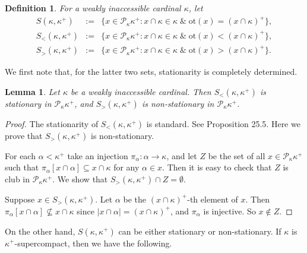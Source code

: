 \documentclass[a4paper,12pt,reqno,oneside]{amsart}
\theoremstyle{plain}
\newtheorem{lemma}[theorem]{Lemma}
\newtheorem*{definition*}{Definition}
\newcommand{\otp}{\mathrm{ot}}
\newcommand{\mcal}{\mathcal}
\begin{document}
\begin{definition*}
For a weakly inaccessible cardinal $\kappa$, let
\begin{eqnarray*}
S ( \kappa , \kappa^+ ) & := & \{ x \in \mcal{P}_\kappa \kappa^+ : x \cap \kappa \in \kappa \;\&\; \otp (x) = ( x \cap \kappa )^+ \} , \\
S_<(\kappa, \kappa^+ ) & := & \{ x \in \mcal{P}_\kappa \kappa^+ :  x \cap \kappa \in \kappa \;\&\; \otp (x) < (x\cap \kappa)^+ \} , \\
S_> (\kappa, \kappa^+ ) & := & \{ x \in \mcal{P}_\kappa \kappa^+ :  x \cap \kappa \in \kappa \;\&\; \otp (x) > (x\cap \kappa)^+ \} .
\end{eqnarray*}
\end{definition*}


We first note that, for the latter two sets, stationarity is completely determined.

\begin{lemma}\label{lem:S_<_S_>_stat} 
Let $\kappa$ be a weakly inaccessible cardinal. Then $S_< ( \kappa , \kappa^+ )$ is stationary in $\mcal{P}_\kappa \kappa^+$, and $S_> ( \kappa , \kappa^+ )$ is non-stationary in $\mcal{P}_\kappa \kappa^+$.
\end{lemma}


\begin{proof} %
The stationarity of $S_< ( \kappa , \kappa^+ )$ is standard. See \cite{K} Proposition 25.5. Here we prove that $S_> ( \kappa , \kappa^+ )$ is non-stationary.

For each $\alpha < \kappa^+$ take an injection $\pi_\alpha : \alpha \to \kappa$, and let $Z$ be the set of all $x \in \mcal{P}_\kappa \kappa^+$ such that $\pi_\alpha [ x \cap \alpha ] \subseteq x \cap \kappa$ for any $\alpha \in x$. Then it is easy to check that $Z$ is club in $\mcal{P}_\kappa \kappa^+$. We show that $S_> ( \kappa , \kappa^+ ) \cap Z = \emptyset$.

Suppose $x \in S_> ( \kappa , \kappa^+ )$. Let $\alpha$ be the $( x \cap \kappa )^+$-th element of $x$. Then $\pi_\alpha [ x \cap \alpha ] \not\subseteq x \cap \kappa$ since $| x \cap \alpha | = ( x \cap \kappa )^+$, and $\pi_\alpha$ is injective. So $x \notin Z$.
\end{proof}%


On the other hand, $S( \kappa , \kappa^+ )$ can be either stationary or non-stationary. If $\kappa$ is $\kappa^+$-supercompact, then we have the following.
\end{document}
